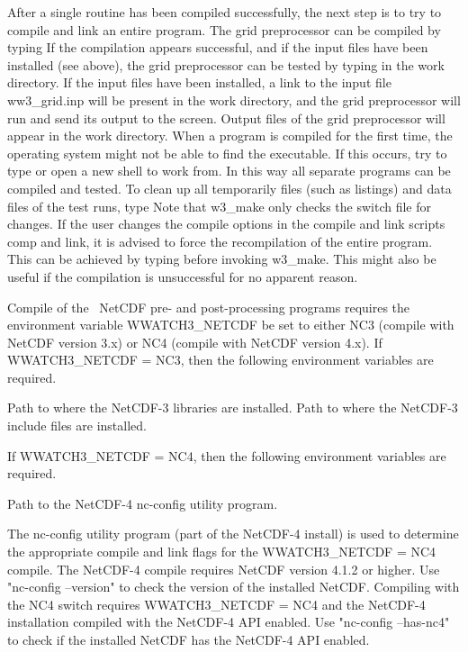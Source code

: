 After a single routine has been compiled successfully, the next step is to try
to compile and link an entire program. The grid preprocessor can be compiled
by typing  If the compilation appears successful,
and if the input files have been installed (see above), the grid preprocessor
can be tested by typing  in the work directory. If the
input files have been installed, a link to the input file {\file
ww3\_grid.inp} will be present in the work directory, and the grid
preprocessor will run and send its output to the screen. Output files of the
grid preprocessor will appear in the work directory. When a program is
compiled for the first time, the operating system might not be able to find
the executable. If this occurs, try to type  or open a new
shell to work from. In this way all separate programs can be compiled and
tested. To clean up all temporarily files (such as listings) and data files of
the test runs, type  Note that {\file w3\_make} only checks
the switch file for changes. If the user changes the compile options in the
compile and link scripts {\file comp} and {\file link}, it is advised to force
the recompilation of the entire program. This can be achieved by typing
 before invoking {\file w3\_make}. This
might also be useful if the compilation is unsuccessful for no apparent
reason.

\vspace{\baselineskip} 
\noindent
Compile of the \ws\ NetCDF pre- and post-processing programs requires the
environment variable {\file WWATCH3\_NETCDF} be set to either
NC3 (compile with NetCDF version 3.x) or
NC4 (compile with NetCDF version 4.x).
If {\file WWATCH3\_NETCDF} = NC3, then the following environment variables
are required.
\begin{flist}
 {Path to where the NetCDF-3 libraries are installed.}
 {Path to where the NetCDF-3 include files are installed.}
\end{flist}
If {\file WWATCH3\_NETCDF} = NC4, then the following environment variables
are required.
\begin{flist}
 {Path to the NetCDF-4 nc-config utility program.}
\end{flist}
The nc-config utility program (part of the NetCDF-4 install) is used to
determine the appropriate compile and link flags for the
{\file WWATCH3\_NETCDF} = NC4 compile.
The NetCDF-4 compile requires NetCDF version 4.1.2 or higher.
Use "{\code nc-config --version}" to check the version of the installed
NetCDF.
Compiling with the {\sc NC4} switch requires {\file WWATCH3\_NETCDF} = NC4
and the NetCDF-4 installation compiled with the NetCDF-4 API enabled.
Use "{\code nc-config --has-nc4}" to check if the installed NetCDF has
the NetCDF-4 API enabled.

